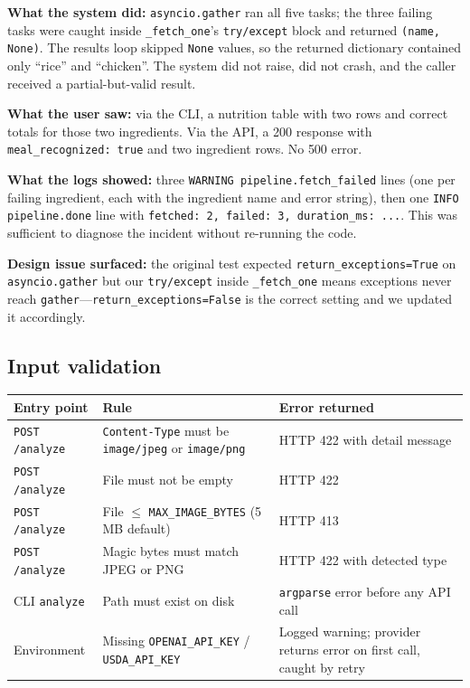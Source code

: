 \documentclass[11pt,a4paper]{article}
\begin{document}
\textbf{What the system did:} \texttt{asyncio.gather} ran all five tasks; the three failing tasks were caught inside \texttt{\_fetch\_one}'s \texttt{try/except} block and returned \texttt{(name, None)}. The results loop skipped \texttt{None} values, so the returned dictionary contained only ``rice'' and ``chicken''. The system did not raise, did not crash, and the caller received a partial-but-valid result.

\textbf{What the user saw:} via the CLI, a nutrition table with two rows and correct totals for those two ingredients. Via the API, a 200 response with \texttt{meal\_recognized: true} and two ingredient rows. No 500 error.

\textbf{What the logs showed:} three \texttt{WARNING pipeline.fetch\_failed} lines (one per failing ingredient, each with the ingredient name and error string), then one \texttt{INFO pipeline.done} line with \texttt{fetched: 2, failed: 3, duration\_ms: ...}. This was sufficient to diagnose the incident without re-running the code.

\textbf{Design issue surfaced:} the original test expected \texttt{return\_exceptions=True} on \texttt{asyncio.gather} but our \texttt{try/except} inside \texttt{\_fetch\_one} means exceptions never reach \texttt{gather}---\texttt{return\_exceptions=False} is the correct setting and we updated it accordingly.

\subsection{Input validation}

\begin{tabular}{llp{6cm}}
\toprule
\textbf{Entry point} & \textbf{Rule} & \textbf{Error returned} \\
\midrule
\texttt{POST /analyze} & \texttt{Content-Type} must be \texttt{image/jpeg} or \texttt{image/png} & HTTP 422 with detail message \\
\texttt{POST /analyze} & File must not be empty & HTTP 422 \\
\texttt{POST /analyze} & File $\leq$ \texttt{MAX\_IMAGE\_BYTES} (5\,MB default) & HTTP 413 \\
\texttt{POST /analyze} & Magic bytes must match JPEG or PNG & HTTP 422 with detected type \\
CLI \texttt{analyze} & Path must exist on disk & \texttt{argparse} error before any API call \\
Environment & Missing \texttt{OPENAI\_API\_KEY} / \texttt{USDA\_API\_KEY} & Logged warning; provider returns error on first call, caught by retry \\
\bottomrule
\end{tabular}
\end{document}

